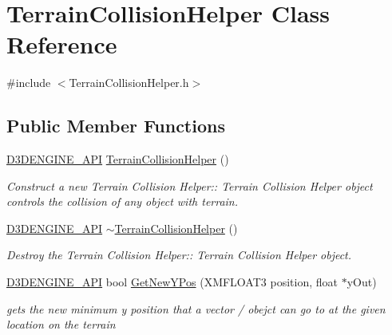 \hypertarget{class_terrain_collision_helper}{}\section{Terrain\+Collision\+Helper Class Reference}
\label{class_terrain_collision_helper}


{\ttfamily \#include $<$Terrain\+Collision\+Helper.\+h$>$}

\subsection*{Public Member Functions}
\begin{DoxyCompactItemize}
\item 
\mbox{\hyperlink{stdafx_8h_a8ee2d990c5dfba7794dd2b60741d7722}{D3\+D\+E\+N\+G\+I\+N\+E\+\_\+\+A\+PI}} \mbox{\hyperlink{class_terrain_collision_helper_a467eee1fdad8e365779f1ba2b0cbd9d6}{Terrain\+Collision\+Helper}} ()
\begin{DoxyCompactList}\small\item\em Construct a new Terrain Collision Helper\+:\+: Terrain Collision Helper object controls the collision of any object with terrain. \end{DoxyCompactList}\item 
\mbox{\hyperlink{stdafx_8h_a8ee2d990c5dfba7794dd2b60741d7722}{D3\+D\+E\+N\+G\+I\+N\+E\+\_\+\+A\+PI}} \mbox{\hyperlink{class_terrain_collision_helper_ae9cbd2eca918548415c2f2439e214b07}{$\sim$\+Terrain\+Collision\+Helper}} ()
\begin{DoxyCompactList}\small\item\em Destroy the Terrain Collision Helper\+:\+: Terrain Collision Helper object. \end{DoxyCompactList}\item 
\mbox{\hyperlink{stdafx_8h_a8ee2d990c5dfba7794dd2b60741d7722}{D3\+D\+E\+N\+G\+I\+N\+E\+\_\+\+A\+PI}} bool \mbox{\hyperlink{class_terrain_collision_helper_a598c308135618bd2a1d5653be8d3b3d0}{Get\+New\+Y\+Pos}} (X\+M\+F\+L\+O\+A\+T3 position, float $\ast$y\+Out)
\begin{DoxyCompactList}\small\item\em gets the new minimum y position that a vector / obejct can go to at the given location on the terrain \end{DoxyCompactList}\end{DoxyCompactItemize}
